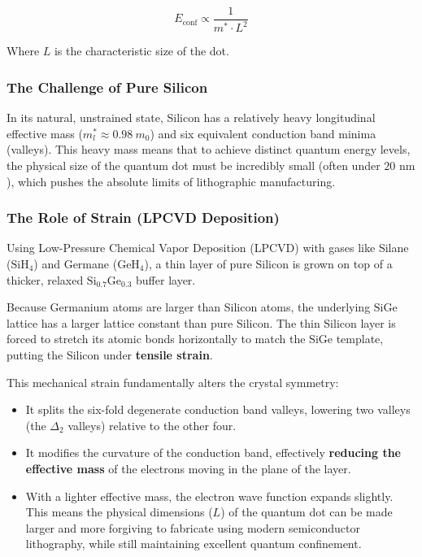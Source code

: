 \documentclass[
]{article}
\providecommand{\tightlist}{%
  \setlength{\itemsep}{0pt}\setlength{\parskip}{0pt}}
\begin{document}
\[E_{\text{conf}} \propto \frac{1}{m^* \cdot L^2}\]

Where \(L\) is the characteristic size of the dot.

\subsubsection{The Challenge of Pure
Silicon}\label{the-challenge-of-pure-silicon}

In its natural, unstrained state, Silicon has a relatively heavy
longitudinal effective mass (\(m_l^* \approx 0.98\ m_0\)) and six
equivalent conduction band minima (valleys). This heavy mass means that
to achieve distinct quantum energy levels, the physical size of the
quantum dot must be incredibly small (often under \(20\text{ nm}\)),
which pushes the absolute limits of lithographic manufacturing.

\subsubsection{The Role of Strain (LPCVD
Deposition)}\label{the-role-of-strain-lpcvd-deposition}

Using Low-Pressure Chemical Vapor Deposition (LPCVD) with gases like
Silane (\(\text{SiH}_4\)) and Germane (\(\text{GeH}_4\)), a thin layer
of pure Silicon is grown on top of a thicker, relaxed
\(\text{Si}_{0.7}\text{Ge}_{0.3}\) buffer layer.

Because Germanium atoms are larger than Silicon atoms, the underlying
\(\text{SiGe}\) lattice has a larger lattice constant than pure Silicon.
The thin Silicon layer is forced to stretch its atomic bonds
horizontally to match the \(\text{SiGe}\) template, putting the Silicon
under \textbf{tensile strain}.

This mechanical strain fundamentally alters the crystal symmetry:

\begin{itemize}
\tightlist
\item
  It splits the six-fold degenerate conduction band valleys, lowering
  two valleys (the \(\Delta_2\) valleys) relative to the other four.
\item
  It modifies the curvature of the conduction band, effectively
  \textbf{reducing the effective mass} of the electrons moving in the
  plane of the layer.
\item
  With a lighter effective mass, the electron wave function expands
  slightly. This means the physical dimensions (\(L\)) of the quantum
  dot can be made larger and more forgiving to fabricate using modern
  semiconductor lithography, while still maintaining excellent quantum
  confinement.
\end{itemize}
\end{document}
